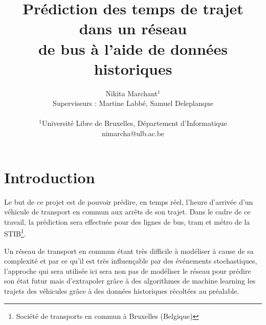\documentclass[letterpaper]{article}
\title{Prédiction des temps de trajet dans un réseau\\ de bus à l'aide de données historiques}
\author{Nikita Marchant$^{1}$\\
Superviseurs : Martine Labbé, Samuel Deleplanque
\mbox{}\\\\
$^1$Université Libre de Bruxelles, Département d'Informatique\\
nimarcha@ulb.ac.be}
\begin{document}
\maketitle

\begin{abstract}

\end{abstract}

\section{Introduction}

Le but de ce projet est de pouvoir prédire, en temps réel, l'heure d'arrivée d'un véhicule de transport en commun aux arrêts de son trajet.
Dans le cadre de ce travail, la prédiction sera effectuée pour des lignes de bus,
tram et métro de la STIB\footnote{Société de transports en commun à Bruxelles (Belgique)}.

Un réseau de transport en commun étant très difficile à modéliser à cause de sa complexité et par ce qu'il est très influençable par des événements stochastiques,
l'approche qui sera utilisée ici sera non pas de modéliser le réseau pour prédire son état futur mais d'extrapoler grâce à des algorithmes de machine learning les trajets des véhicules grâce à des données historiques récoltées au préalable.







\end{document}
